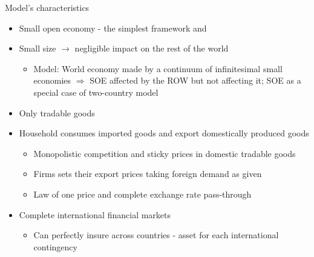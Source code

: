 \documentclass[9pt]{beamer}
\begin{document}
\begin{frame}{Model’s characteristics}
\begin{itemize}
    \item Small open economy - the simplest framework \textcolor{red}{\citet{Gali:2005}} and \textcolor{red}{\citet{Lubik:2007}}
    
    \item Small size $\rightarrow$ negligible impact on the rest of the world
    \begin{itemize}
        \item Model: World economy made by a continuum of infinitesimal small economies $\Rightarrow$ SOE affected by the ROW but not affecting it; SOE as a special case of two-country model
    \end{itemize}
    
    \item Only tradable goods

    \item Household consumes imported goods and export domestically produced goods
    \begin{itemize}
        \item Monopolistic competition and sticky prices in domestic tradable goods
        
        \item Firms sets their export prices taking foreign demand as given
        
        \item Law of one price and complete exchange rate pass-through
    \end{itemize}
    
    \item Complete international financial markets
    \begin{itemize}
        \item Can perfectly insure across countries - asset for each international contingency
    \end{itemize}
    
    
    
    
\end{itemize}


\end{frame}
\end{document}
